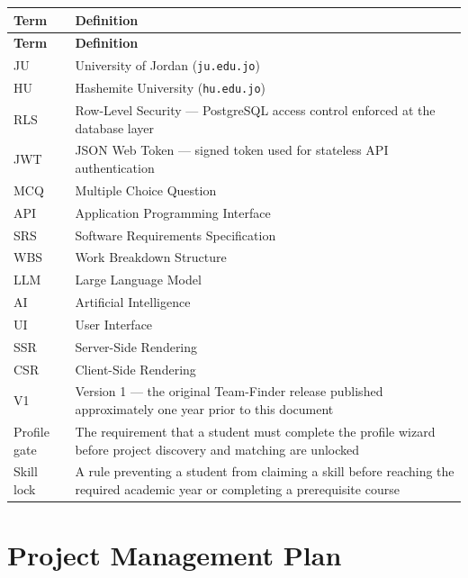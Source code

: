 \documentclass[12pt,a4paper]{article}
\begin{document}
\begin{longtable}{@{} L{3.5cm} L{11cm} @{}}
\toprule
\textbf{Term} & \textbf{Definition} \\
\midrule
\endfirsthead
\toprule
\textbf{Term} & \textbf{Definition} \\
\midrule
\endhead
\bottomrule
\endlastfoot
JU          & University of Jordan (\texttt{ju.edu.jo}) \\[2pt]
HU          & Hashemite University (\texttt{hu.edu.jo}) \\[2pt]
RLS         & Row-Level Security --- PostgreSQL access control enforced at the database layer \\[2pt]
JWT         & JSON Web Token --- signed token used for stateless API authentication \\[2pt]
MCQ         & Multiple Choice Question \\[2pt]
API         & Application Programming Interface \\[2pt]
SRS         & Software Requirements Specification \\[2pt]
WBS         & Work Breakdown Structure \\[2pt]
LLM         & Large Language Model \\[2pt]
AI          & Artificial Intelligence \\[2pt]
UI          & User Interface \\[2pt]
SSR         & Server-Side Rendering \\[2pt]
CSR         & Client-Side Rendering \\[2pt]
V1          & Version 1 --- the original Team-Finder release published approximately one year prior to this document \\[2pt]
Profile gate & The requirement that a student must complete the profile wizard before project discovery and matching are unlocked \\[2pt]
Skill lock  & A rule preventing a student from claiming a skill before reaching the required academic year or completing a prerequisite course \\
\end{longtable}

\newpage
\section{Project Management Plan}
\end{document}
